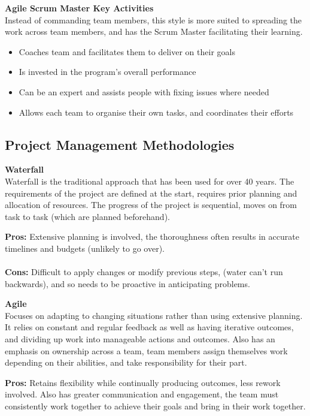 \documentclass[a4paper,10pt]{article}
\begin{document}
\textcolor{BlueGreen}{\textbf{Agile Scrum Master Key Activities}}\\
Instead of commanding team members, this style is more suited to spreading the work across team members, and has the Scrum Master facilitating their learning. 
\begin{itemize}
	\item Coaches team and facilitates them to deliver on their goals 
	\item Is invested in the program's overall performance 
	\item Can be an expert and assists people with fixing issues where needed 
	\item Allows each team to organise their own tasks, and coordinates their efforts
\end{itemize}
\subsection*{Project Management Methodologies}
\begin{shaded}
	\noindent \textcolor{Emerald}{\textbf{Waterfall}} \\
	Waterfall is the traditional approach that has been used for over 40 years. The requirements of the project are defined at the start, requires prior planning and allocation of resources. The progress of the project is sequential, moves on from task to task (which are planned beforehand). 
\end{shaded}
\noindent \textbf{Pros:} Extensive planning is involved, the thoroughness often results in accurate timelines and budgets (unlikely to go over). \\\\
\textbf{Cons:} Difficult to apply changes or modify previous steps, (water can't run backwards), and so needs to be proactive in anticipating problems. 
\begin{shaded}
	\noindent \textcolor{Emerald}{\textbf{Agile}} \\
	Focuses on adapting to changing situations rather than using extensive planning. It relies on constant and regular feedback as well as having iterative outcomes, and dividing up work into manageable actions and outcomes. Also has an emphasis on ownership across a team, team members assign themselves work depending on their abilities, and take responsibility for their part. 
\end{shaded}
\noindent \textbf{Pros:} Retains flexibility while continually producing outcomes, less rework involved. Also has greater communication and engagement, the team must consistently work together to achieve their goals and bring in their work together. \\\\
\end{document}
